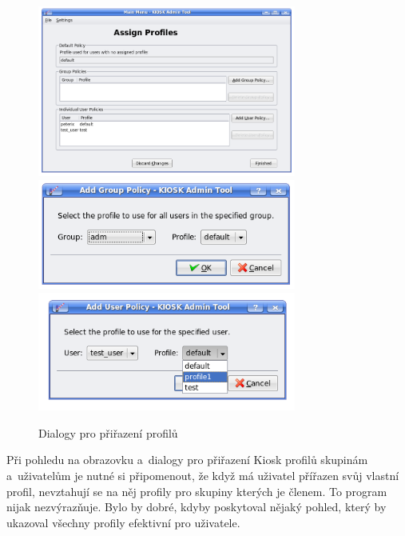 \begin{figure}[h]
    \centering
    \includegraphics[width=8.5cm]{obrazky/KioskToolKDE3/prirazeni_profilu.png}
    \includegraphics[width=8.5cm]{obrazky/KioskToolKDE3/prirazeni_profilu_skupine.png}
    \includegraphics[width=8.5cm]{obrazky/KioskToolKDE3/prirazeni_profilu_uzivateli.png}
    \caption{Dialogy pro přiřazení profilů}
    \label{fig:kt3_prirazeni}
\end{figure}
Při pohledu na obrazovku a~dialogy pro přiřazení Kiosk profilů skupinám
a~uživatelům je nutné si připomenout, že když má uživatel přířazen svůj vlastní
profil, nevztahují se na něj profily pro skupiny kterých je členem. To program
nijak nezvýrazňuje. Bylo by dobré, kdyby poskytoval nějaký pohled, který by
ukazoval všechny profily efektivní pro uživatele.

